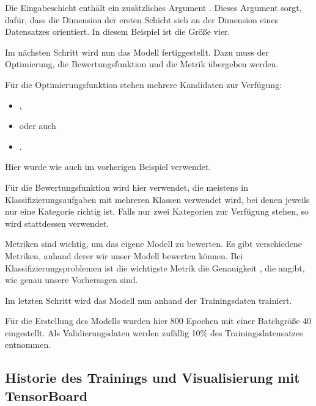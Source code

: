 Die Eingabeschicht enthält ein zusätzliches Argument . Dieses Argument sorgt, dafür, dass die Dimension der ersten Schicht sich an der Dimension eines Datensatzes orientiert. In diesem Beispiel ist die Größe vier.

Im nächsten Schritt wird nun das Modell fertiggestellt. Dazu muss der Optimierung, die Bewertungsfunktion und die Metrik übergeben werden.

\medskip



\medskip

Für die Optimierungsfunktion stehen mehrere Kandidaten zur Verfügung:

\begin{itemize}
  \item {}, 
  \item {} oder auch 
  \item {}.
\end{itemize}  

\medskip

 Hier wurde wie auch im vorherigen Beispiel  verwendet.

Für die Bewertungsfunktion wird hier  verwendet, die meistens in Klassifizierungsaufgaben mit mehreren Klassen verwendet wird, bei denen jeweils nur eine Kategorie richtig ist. Falls nur zwei Kategorien zur Verfügung stehen, so wird stattdessen  verwendet.

Metriken sind wichtig, um das eigene Modell zu bewerten. Es gibt verschiedene Metriken, anhand derer wir unser Modell bewerten können. Bei Klassifizierungsproblemen ist die wichtigste Metrik die Genauigkeit \PYTHON{['acc']}, die angibt, wie genau unsere Vorhersagen sind.

Im letzten Schritt wird das Modell nun anhand der Trainingsdaten trainiert.

\medskip


\medskip

Für die Erstellung des Modells wurden hier 800 Epochen mit einer Batchgröße 40 eingestellt. Als Validierungsdaten werden zufällig 
10\% des Trainingsdatensatzes entnommen.

\subsection{Historie des Trainings und Visualisierung mit TensorBoard}

